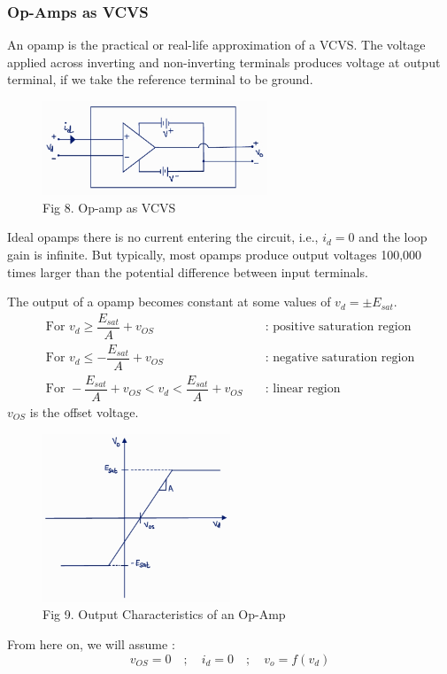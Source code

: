 \documentclass[12pt]{article}
\begin{document}
\subsubsection{Op-Amps as VCVS}
An opamp is the practical or real-life approximation of a VCVS. The voltage applied across inverting and non-inverting terminals produces voltage at output terminal, if we take the reference terminal to be ground.
\begin{figure}[H]
	\centering
	\includegraphics[width=0.6\textwidth]{Images/fig8_opamp as vcvs.png}
	\caption{Fig 8. Op-amp as VCVS}
\end{figure}
Ideal opamps there is no current entering the circuit, i.e., $i_d=0$ and the loop gain is infinite. But typically, most opamps produce output voltages 100,000 times larger than the potential difference between input terminals. \linebreak

The output of a opamp becomes constant at some values of $v_d=\pm E_{sat}$.
\begin{align*}
	\text{For } v_d\geq \dfrac{E_{sat}}{A}+v_{OS} & \quad \text{: positive saturation region} \\
	\text{For } v_d\leq-\dfrac{E_{sat}}{A}+v_{OS} & \quad \text{: negative saturation region} \\
	\text{For } -\dfrac{E_{sat}}{A}+v_{OS}< v_d < \dfrac{E_{sat}}{A}+v_{OS} & \quad \text{: linear region}
\end{align*}
$v_{OS}$ is the offset voltage. 
\begin{figure}[H]
	\centering
	\includegraphics[width=0.5\textwidth]{Images/fig9_opamp characteristics.png}
	\caption{Fig 9. Output Characteristics of an Op-Amp}
\end{figure}
From here on, we will assume :
\[ v_{OS} =0 \quad ; \quad i_d=0 \quad ; \quad v_o=f(v_d) \]
%
\end{document}
